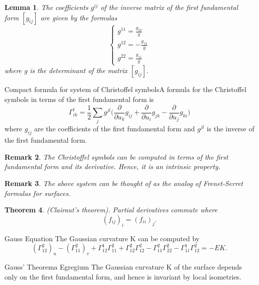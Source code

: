 \documentclass[twoside]{article}
\newcounter{lecnum}
\newtheorem{theorem}{Theorem}[lecnum]
\newtheorem{lemma}[theorem]{Lemma}
\newtheorem{remark}[theorem]{Remark}
\begin{document}
\begin{lemma}The coefficients $g^{ij}$ of the inverse matrix of the first fundamental form $[g_{ij}]$ are given by the formulas 
$$
\begin{cases}
g^{11} = \frac{g_{22}}{g}\\
g^{12} = -\frac{g_{12}}{g}\\
g^{22} = \frac{g_{11}}{g}
\end{cases}
$$
where g is the determinant of the matrix $[g_{ij}].$
\end{lemma}

\begin{proposition_exam}{Compact formula for system of Christoffel symbols}{}A formula for the Christoffel symbols in terms of the first fundamental form is
$$
\Gamma_{ik}^{l} = \frac{1}{2}\sum_{j}g^{jl}\bigg(\frac{\partial}{\partial u_k}g_{ij} + \frac{\partial}{\partial u_i}g_{jk} - \frac{\partial}{\partial u_j}g_{ki} \bigg)
$$
where $g_{ij}$ are the coefficients of the first fundamental form and $g^{jl}$ is the inverse of the first fundamental form.
\end{proposition_exam}

\begin{remark}The Christoffel symbols can be computed in terms of the first fundamental form and its derivative. Hence, it is an intrinsic property.
\end{remark}

\begin{remark}The above system can be thought of as the analog of Frenet-Serret formulas for surfaces.
\end{remark}

\begin{theorem}(Clairaut's theorem). Partial derivatives commute where 
$$
(f_{ij})_i = (f_{ii})_j.
$$
\end{theorem}

\begin{definition_exam}{Gauss Equation}{} The Gaussian curvature K can be computed by 
$$
(\Gamma_{12}^{2})_u - (\Gamma_{11}^{2})_v + \Gamma_{12}^1\Gamma_{11}^2 + \Gamma_{12}^2\Gamma_{12}^2 - \Gamma_{11}^{2}\Gamma_{22}^{2} - \Gamma_{11}^{1}\Gamma_{12}^{2} = -EK.
$$
\end{definition_exam}

\begin{theorem_exam}{Gauss' Theorema Egregium}{} The Gaussian curvature K of the surface depends only on the first fundamental form, and hence is invariant by local isometries.
\end{theorem_exam}
\end{document}
